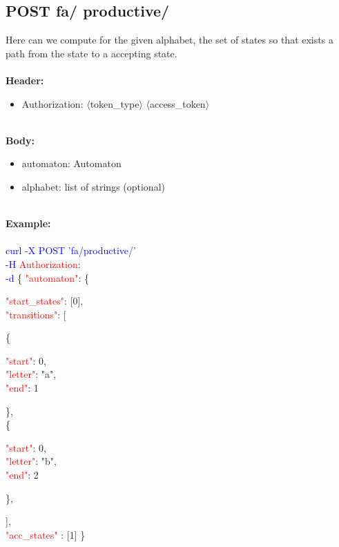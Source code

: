 \subsection{POST fa/ productive/}
Here can we compute for the given alphabet, the set of states so that exists a path from the state to a accepting state. \\
\ \\
\textbf{Header:}
\begin{itemize}
    \item Authorization: $\langle$token\_type$\rangle$ $\langle$access\_token$\rangle$
\end{itemize}
\ \\
\textbf{Body:}
\begin{itemize}
    \item automaton: Automaton
    \item alphabet: list of strings (optional)
\end{itemize}
\ \\
\textbf{Example:} \\
\ \\
\textcolor{blue}{curl -X POST '\BaseURL fa/productive/'\\
-H} \textcolor{red}{Authorization}: \Auth \\
\textcolor{blue}{-d} \{ 
     \textcolor{red}{"automaton"}: \{
     \begin{adjustwidth}{7.5 mm}{0 cm}
     \begin{adjustwidth}{7.5 mm}{0 cm}
            \textcolor{red}{"start\_states"}: [0],\\
            \textcolor{red}{"transitions"}: [
            \begin{adjustwidth}{7.5 mm}{0 cm}
            \{
               \begin{adjustwidth}{7.5 mm}{0 cm}
                    \textcolor{red}{"start"}: 0,\\
                    \textcolor{red}{"letter"}: "a",\\
                    \textcolor{red}{"end"}: 1
               \end{adjustwidth}
            \}, \\
            \{
               \begin{adjustwidth}{7.5 mm}{0 cm}
                    \textcolor{red}{"start"}: 0,\\
                    \textcolor{red}{"letter"}: "b",\\
                    \textcolor{red}{"end"}: 2
               \end{adjustwidth}
            \},
            \end{adjustwidth}
            ],\\
        \textcolor{red}{"acc\_states" }: [1]  \}
    \end{adjustwidth}
    \end{adjustwidth}
